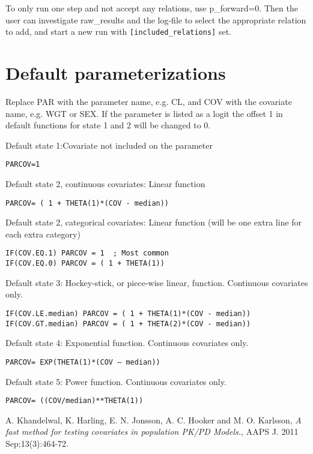 To only run one step and not accept any relations, use p\_forward=0. Then the user can investigate raw\_results and the log-file to select the appropriate relation to add, and start a new run with 
\verb|[included_relations]| set.

\section{Default parameterizations}
Replace PAR with the parameter name, e.g. CL, and COV with the covariate name, e.g. WGT or SEX.
If the parameter is listed as a logit the offset 1 in default functions for state 1 and 2 will be changed to 0.

Default state 1:Covariate not included on the parameter
\begin{verbatim}
PARCOV=1
\end{verbatim}

Default state 2, continuous covariates: Linear function
\begin{verbatim}
PARCOV= ( 1 + THETA(1)*(COV - median))
\end{verbatim}

Default state 2, categorical covariates: Linear function (will be one extra line for each extra category)
\begin{verbatim}
IF(COV.EQ.1) PARCOV = 1  ; Most common
IF(COV.EQ.0) PARCOV = ( 1 + THETA(1))
\end{verbatim}

Default state 3: Hockey-stick, or piece-wise linear, function. Continuous covariates only.
\begin{verbatim}
IF(COV.LE.median) PARCOV = ( 1 + THETA(1)*(COV - median))
IF(COV.GT.median) PARCOV = ( 1 + THETA(2)*(COV - median))
\end{verbatim}

Default state 4: Exponential function. Continuous covariates only.
\begin{verbatim}
PARCOV= EXP(THETA(1)*(COV – median))
\end{verbatim}

Default state 5: Power function. Continuous covariates only.
\begin{verbatim}
PARCOV= ((COV/median)**THETA(1))
\end{verbatim}

\begin{thebibliography}{99}
  A. Khandelwal, K. Harling, E. N. Jonsson, A. C. Hooker and M. O. Karlsson,
\emph{A fast method for testing covariates in population PK/PD Models.},
AAPS J. 2011 Sep;13(3):464-72. 
\end{thebibliography}


